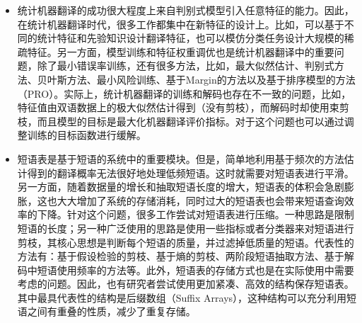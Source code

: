 \begin{itemize}
\vspace{0.5em}
\item 统计机器翻译的成功很大程度上来自判别式模型引入任意特征的能力。因此，在统计机器翻译时代，很多工作都集中在新特征的设计上。比如，可以基于不同的统计特征和先验知识设计翻译特征，也可以模仿分类任务设计大规模的稀疏特征。另一方面，模型训练和特征权重调优也是统计机器翻译中的重要问题，除了最小错误率训练，还有很多方法，比如，最大似然估计、判别式方法、贝叶斯方法、最小风险训练、基于Margin的方法以及基于排序模型的方法（PRO）。实际上，统计机器翻译的训练和解码也存在不一致的问题，比如，特征值由双语数据上的极大似然估计得到（没有剪枝），而解码时却使用束剪枝，而且模型的目标是最大化机器翻译评价指标。对于这个问题也可以通过调整训练的目标函数进行缓解。
\vspace{0.5em}
\item 短语表是基于短语的系统中的重要模块。但是，简单地利用基于频次的方法估计得到的翻译概率无法很好地处理低频短语。这时就需要对短语表进行平滑。另一方面，随着数据量的增长和抽取短语长度的增大，短语表的体积会急剧膨胀，这也大大增加了系统的存储消耗，同时过大的短语表也会带来短语查询效率的下降。针对这个问题，很多工作尝试对短语表进行压缩。一种思路是限制短语的长度；另一种广泛使用的思路是使用一些指标或者分类器来对短语进行剪枝，其核心思想是判断每个短语的质量，并过滤掉低质量的短语。代表性的方法有：基于假设检验的剪枝、基于熵的剪枝、两阶段短语抽取方法、基于解码中短语使用频率的方法等。此外，短语表的存储方式也是在实际使用中需要考虑的问题。因此，也有研究者尝试使用更加紧凑、高效的结构保存短语表。其中最具代表性的结构是后缀数组（Suffix Arrays），这种结构可以充分利用短语之间有重叠的性质，减少了重复存储。
\vspace{0.5em}
\end{itemize}











